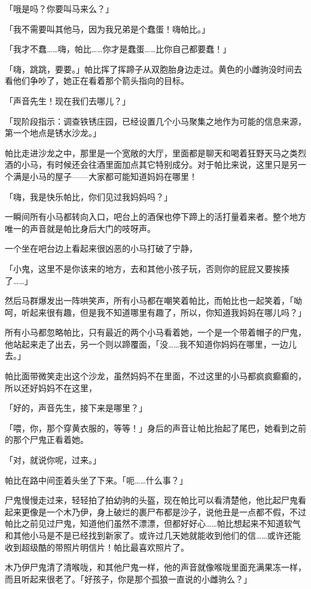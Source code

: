 「哦是吗？你要叫马来么？」

「我不需要叫其他马，因为我兄弟是个蠢蛋！嗨帕比。」

「我才不蠢……嗨，帕比……你才是蠢蛋……比你自己都要蠢！」

「嗨，跳跳，要要。」帕比挥了挥蹄子从双胞胎身边走过。黄色的小雌驹没时间去看他们争吵了，她正在看着那个箭头指向的目标。

「声音先生！现在我们去哪儿？」

「{\mt 现阶段指示：调查铁锈庄园，已经设置几个小马聚集之地作为可能的信息来源，第一个地点是锈水沙龙。}」

帕比走进沙龙之中，那里是一个宽敞的大厅，里面都是聊天和喝着狂野天马之类烈酒的小马，有时候还会往酒里面加点其它特别成分。对于帕比来说，这里只是另一个满是小马的屋子——大家都可能知道妈妈在哪里！

「嗨，我是快乐帕比，你们见过我妈妈吗？」

一瞬间所有小马都转向入口，吧台上的酒保也停下蹄上的活打量着来者。整个地方唯一的声音就是帕比身后大门的吱呀声。

一个坐在吧台边上看起来很凶恶的小马打破了宁静，

「小鬼，这里不是你该来的地方，去和其他小孩子玩，否则你的屁屁又要挨揍了……」

然后马群爆发出一阵哄笑声，所有小马都在嘲笑着帕比，而帕比也一起笑着，「呦呵，听起来很有趣，但是我不知道哪里有趣了，所以，你知道我妈妈在哪儿吗？」

所有小马都忽略帕比，只有最近的两个小马看着她，一个是一个带着帽子的尸鬼，他站起来走了出去，另一个则以蹄覆面，「没……我不知道你妈妈在哪里，一边儿去。」

帕比面带微笑走出这个沙龙，虽然妈妈不在里面，不过这里的小马都疯疯癫癫的，所以还好妈妈不在这里，

「好的，声音先生，接下来是哪里？」

「喂，你，那个穿黄衣服的，等等！」身后的声音让帕比抬起了尾巴，她看到之前的那个尸鬼正看着她。

「对，就说你呢，过来。」

帕比在路中间歪着头坐了下来。「呃……什么事？」

尸鬼慢慢走过来，轻轻拍了拍幼驹的头盔，现在帕比可以看清楚他，他比起尸鬼看起来更像是一个木乃伊，身上破烂的裹尸布都是沙子，说他丑是一点都不假，不过帕比之前见过尸鬼，知道他们虽然不漂漂，但都好好心……帕比想起来不知道软气和其他小马是不是已经找到新家了。或许过几天她就能收到他们的信……或许还能收到超级酷的带照片明信片！帕比最喜欢照片了。

木乃伊尸鬼清了清喉咙，和其他尸鬼一样，他的声音就像喉咙里面充满果冻一样，而且听起来很老了。「好孩子，你是那个孤狼一直说的小雌驹么？」

